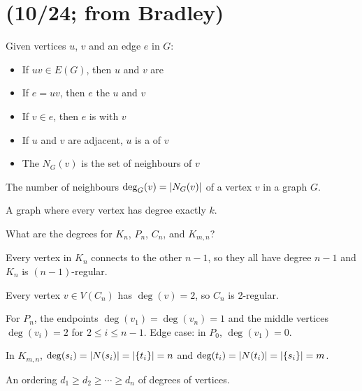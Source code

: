 \documentclass[class=math239,notes,tikz]{agony}
\begin{document}
\section{(10/24; from Bradley)}

\begin{defn}
  Given vertices $u$, $v$ and an edge $e$ in $G$:
  \begin{itemize}[nosep]
    \item If $uv \in E(G)$, then $u$ and $v$ are 
    \item If $e = uv$, then $e$  the  $u$ and $v$
    \item If $v \in e$, then $e$ is  with $v$
    \item If $u$ and $v$ are adjacent, $u$ is a  of $v$
    \item The  $N_G(v)$ is the set of neighbours of $v$
  \end{itemize}
\end{defn}

\begin{defn}[degree]
  The number of neighbours $\deg_G(v) = \abs{N_G(v)}$ of a vertex $v$ in a graph $G$.
\end{defn}

\begin{defn}[$k$-regularity]
  A graph where every vertex has degree exactly $k$.
\end{defn}

\begin{example}
  What are the degrees for $K_n$, $P_n$, $C_n$, and $K_{m,n}$?
\end{example}
\begin{sol}
  Every vertex in $K_n$ connects to the other $n-1$,
  so they all have degree $n-1$ and $K_n$ is $(n-1)$-regular.

  Every vertex $v \in V(C_n)$ has $\deg(v) = 2$, so $C_n$ is 2-regular.

  For $P_n$, the endpoints $\deg(v_1) = \deg(v_n) = 1$
  and the middle vertices $\deg(v_i) = 2$ for $2 \leq i \leq n-1$.
  Edge case: in $P_0$, $\deg(v_1) = 0$.

  In $K_{m,n}$, $\deg(s_i) = \abs{N(s_i)} = \abs{\{t_i\}} = n$
  and $\deg(t_i) = \abs{N(t_i)} = \abs{\{s_i\}} = m$.
\end{sol}

\begin{defn}
  An ordering $d_1 \geq d_2 \geq \dotsb \geq d_n$ of degrees of vertices.
\end{defn}
\end{document}
